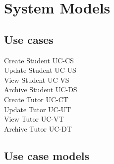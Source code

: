 \documentclass[11pt,a4paper]{article}
\begin{document}
	\section{System Models}
		\subsection{	Use cases}
			Create Student		UC-CS
			\\Update Student 	UC-US
			\\View Student      UC-VS
			\\Archive Student	UC-DS
			\\Create Tutor		UC-CT
			\\Update Tutor		UC-UT
			\\View Tutor			UC-VT
			\\Archive Tutor		UC-DT
						
		\subsection{Use case models}
		
\end{document}
